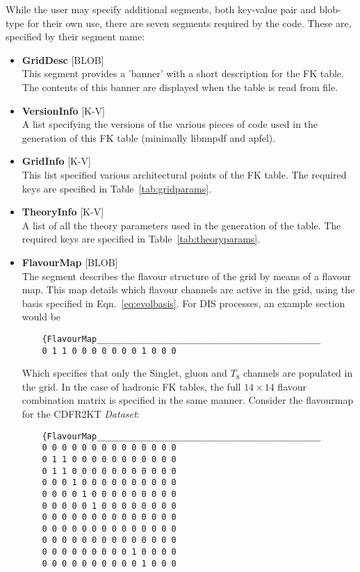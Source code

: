 \documentclass[11pt]{article}
\begin{document}
While the user may specify additional segments, both key-value pair and
blob-type for their own use, there are seven segments required by the code.
These are, specified by their segment name:
\begin{itemize}
\item \textbf{GridDesc} [BLOB] \\
	This segment provides a 'banner' with a short description for the FK table. The contents of this banner are displayed when the table is read from file.
\item \textbf{VersionInfo} [K-V]\\
	A list specifying the versions of the various pieces of code used in the generation of this FK table (minimally libnnpdf and apfel).
\item \textbf{GridInfo} [K-V]\\
	This list specified various architectural points of the FK table. The required keys are specified in Table~\ref{tab:gridparams}.
\item \textbf{TheoryInfo} [K-V]\\
	A list of all the theory parameters used in the generation of the table. The required keys are specified in Table~\ref{tab:theoryparams}.
\item \textbf{FlavourMap} [BLOB]\\
    The segment describes the flavour structure of the grid by means of a flavour
    map. This map details which flavour channels are active in the grid, using the
    basis specified in Eqn.~\ref{eq:evolbasis}. For DIS processes, an example
    section would be
    \begin{verbatim}
    {FlavourMap_____________________________________________
    0 1 1 0 0 0 0 0 0 0 1 0 0 0
    \end{verbatim}
    Which specifies that only the Singlet, gluon and $T_8$ channels are populated in
    the grid. In the case of hadronic FK tables, the full $14\times 14$ flavour
    combination matrix is specified in the same manner. Consider the flavourmap for
    the CDFR2KT \emph{Dataset}:
    \begin{verbatim}
    {FlavourMap_____________________________________________
    0 0 0 0 0 0 0 0 0 0 0 0 0 0
    0 1 1 0 0 0 0 0 0 0 0 0 0 0
    0 1 1 0 0 0 0 0 0 0 0 0 0 0
    0 0 0 1 0 0 0 0 0 0 0 0 0 0
    0 0 0 0 1 0 0 0 0 0 0 0 0 0
    0 0 0 0 0 1 0 0 0 0 0 0 0 0
    0 0 0 0 0 0 0 0 0 0 0 0 0 0
    0 0 0 0 0 0 0 0 0 0 0 0 0 0
    0 0 0 0 0 0 0 0 0 0 0 0 0 0
    0 0 0 0 0 0 0 0 0 1 0 0 0 0
    0 0 0 0 0 0 0 0 0 0 1 0 0 0

\end{verbatim}
\end{itemize}
\end{document}
